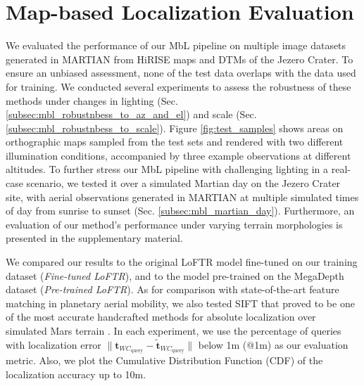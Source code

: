 \section{Map-based Localization Evaluation}
\label{sec:mbl_eval}

We evaluated the performance of our MbL pipeline on multiple image datasets generated in MARTIAN from HiRISE maps and DTMs of the Jezero Crater. To ensure an unbiased assessment, none of the test data overlaps with the data used for training. We conducted several experiments to assess the robustness of these methods under changes in lighting (Sec. \ref{subsec:mbl_robustnbess_to_az_and_el}) and scale (Sec. \ref{subsec:mbl_robustnbess_to_scale}). Figure \ref{fig:test_samples} shows areas on orthographic maps sampled from the test sets and rendered with two different illumination conditions, accompanied by three example observations at different altitudes.
To further stress our MbL pipeline with challenging lighting in a real-case scenario, we tested it over a simulated Martian day on the Jezero Crater site, with aerial observations generated in MARTIAN at multiple simulated times of day from sunrise to sunset (Sec. \ref{subsec:mbl_martian_day}). Furthermore, an evaluation of our method's performance under varying terrain morphologies is presented in the supplementary material.

We compared our results to the original LoFTR model fine-tuned on our training dataset (\textit{Fine-tuned LoFTR}), and to the model pre-trained on the MegaDepth dataset (\textit{Pre-trained LoFTR}). As for comparison with state-of-the-art feature matching in planetary aerial mobility, we also tested SIFT that proved to be one of the most accurate handcrafted methods for absolute localization over simulated Mars terrain \cite{brockers2022}.
In each experiment, we use the percentage of queries with localization error $\|\mathbf{t}_{WC_{\text{query}}} - \widetilde{\mathbf{t}}_{WC_{\text{query}}}\|$ below 1m (@1m) as our evaluation metric. Also, we plot the Cumulative Distribution Function (CDF) of the localization accuracy up to 10m.

